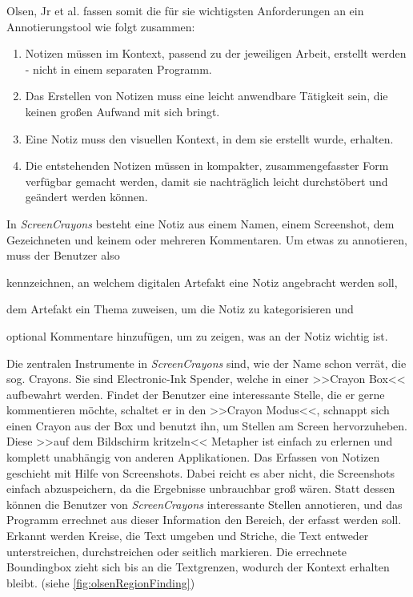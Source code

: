 \medskip Olsen, Jr et al. fassen somit die für sie wichtigsten Anforderungen an ein Annotierungstool wie folgt zusammen:

\begin{enumerate}
	\item Notizen müssen im Kontext, passend zu der jeweiligen Arbeit, erstellt werden - nicht in einem separaten Programm.
	\item Das Erstellen von Notizen muss eine leicht anwendbare Tätigkeit sein, die keinen großen Aufwand mit sich bringt.
	\item Eine Notiz muss den visuellen Kontext, in dem sie erstellt wurde, erhalten.
	\item Die entstehenden Notizen müssen in kompakter, zusammengefasster Form verfügbar gemacht werden, damit sie nachträglich leicht durchstöbert und geändert werden können.
\end{enumerate}

In \emph{ScreenCrayons} besteht eine Notiz aus einem Namen, einem Screenshot, dem Gezeichneten und keinem oder mehreren Kommentaren. Um etwas zu annotieren, muss der Benutzer also 
\begin{inparaenum}[\itshape 1\upshape)]
\item kennzeichnen, an welchem digitalen Artefakt eine Notiz angebracht werden soll,
\item dem Artefakt ein Thema zuweisen, um die Notiz zu kategorisieren und
\item optional Kommentare hinzufügen, um zu zeigen, was an der Notiz wichtig ist.
\end{inparaenum}

\medskip Die zentralen Instrumente in \emph{ScreenCrayons} sind, wie der Name schon verrät, die sog. Crayons. Sie sind Electronic-Ink Spender, welche in einer >>Crayon Box<< aufbewahrt werden. Findet der Benutzer eine interessante Stelle, die er gerne kommentieren möchte, schaltet er in den >>Crayon Modus<<, schnappt sich einen Crayon aus der Box und benutzt ihn, um Stellen am Screen hervorzuheben. Diese >>auf dem Bildschirm kritzeln<< Metapher ist einfach zu erlernen und komplett unabhängig von anderen Applikationen.
Das Erfassen von Notizen geschieht mit Hilfe von Screenshots. Dabei reicht es aber nicht, die Screenshots einfach abzuspeichern, da die Ergebnisse unbrauchbar groß wären. Statt dessen können die Benutzer von \emph{ScreenCrayons} interessante Stellen annotieren, und das Programm errechnet aus dieser Information den Bereich, der erfasst werden soll. Erkannt werden Kreise, die Text umgeben und Striche, die Text entweder unterstreichen, durchstreichen oder seitlich markieren. Die errechnete Boundingbox zieht sich bis an die Textgrenzen, wodurch der Kontext erhalten bleibt. (siehe \autoref{fig:olsenRegionFinding}) 

